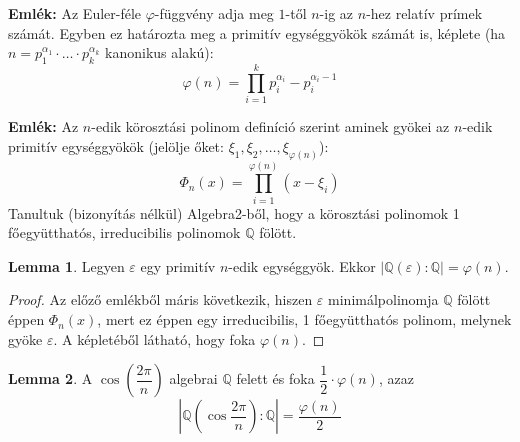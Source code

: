 \documentclass[12pt]{book}
\theoremstyle{plain} %
\theoremstyle{definition} %
\newtheorem{lem/}{Lemma}[section]
\newenvironment{lem}
  {\renewcommand{\qedsymbol}{$\clubsuit$}%
   \pushQED{\qed}\begin{lem/}}
  {\popQED\end{lem/}}
\theoremstyle{remark}
\renewcommand\qedsymbol{$\blacksquare$}
\numberwithin{equation}{section}  %
\begin{document}
	\textbf{Emlék:} Az Euler-féle $\varphi$-függvény adja meg $1$-től $n$-ig az $n$-hez relatív prímek számát. Egyben ez határozta meg a primitív egységgyökök számát is, képlete (ha $n=p_1^{\alpha_1}\cdot \ldots \cdot p_k^{\alpha_k}$ kanonikus alakú):
	\[ \varphi(n) = \prod_{i=1}^{k} p_i^{\alpha_i}-p_i^{\alpha_i-1}    \]
	
	\textbf{Emlék:} Az $n$-edik körosztási polinom definíció szerint aminek gyökei az $n$-edik primitív egységgyökök (jelölje őket: $\xi_1,\xi_2,\ldots,\xi_{\varphi(n)}$):
	\[ \varPhi_n(x) = \prod_{i=1}^{\varphi(n)} (x-\xi_i) \]
	Tanultuk (bizonyítás nélkül) Algebra2-ből, hogy a körosztási polinomok 1 főegyütthatós, irreducibilis polinomok $\mathbb{Q}$ fölött.

	\begin{lem}\label{negyseg}
		Legyen $\varepsilon$ egy primitív $n$-edik egységgyök. Ekkor $|\mathbb{Q}(\varepsilon):\mathbb{Q}| = \varphi(n)$.
	\end{lem}

	\begin{proof}
		Az előző emlékből máris következik, hiszen $\varepsilon$ minimálpolinomja $\mathbb{Q}$ fölött éppen $\varPhi_n(x)$, mert ez éppen egy irreducibilis, 1 főegyütthatós polinom, melynek gyöke $\varepsilon$. A képletéből látható, hogy foka $\varphi(n)$.
	\end{proof}

	\begin{lem}\label{egykettedfi}
		A $\cos\left(\dfrac{2\pi}{n}\right)$ algebrai $\mathbb{Q}$ felett és foka $\dfrac{1}{2}\cdot \varphi(n)$, azaz
		\[ \left|\mathbb{Q}\left(\cos \dfrac{2\pi}{n}\right):\mathbb{Q}\right| = \dfrac{\varphi(n)}{2}  \]
	\end{lem}
	
\end{document}
